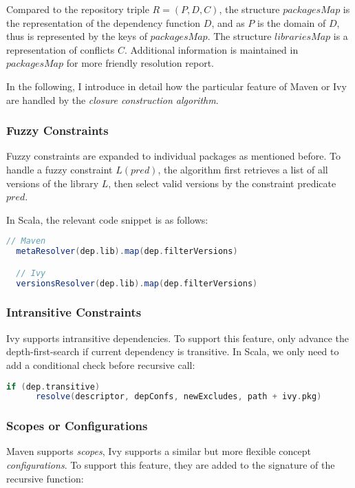 Compared to the repository triple $R = (P, D, C)$, the structure $packagesMap$ is the representation of the dependency function $D$, and as $P$ is the domain of $D$, thus is represented by the keys of $packagesMap$. The structure $librariesMap$ is a representation of conflicts $C$. Additional information is maintained in $packagesMap$ for more friendly resolution report.

In the following, I introduce in detail how the particular feature of Maven or Ivy are handled by the \emph{closure construction algorithm}.

\subsubsection{Fuzzy Constraints}

Fuzzy constraints are expanded to individual packages as mentioned before. To handle a fuzzy constraint $L(pred)$, the algorithm first retrieves a list of all versions of the library $L$, then select valid versions by the constraint predicate $pred$.

In Scala, the relevant code snippet is as follows:

\begin{lstlisting}[language=Scala]
  // Maven
  metaResolver(dep.lib).map(dep.filterVersions)

  // Ivy
  versionsResolver(dep.lib).map(dep.filterVersions)
\end{lstlisting}

\subsubsection{Intransitive Constraints}

Ivy supports intransitive dependencies. To support this feature, only advance the depth-first-search if current dependency is transitive. In Scala, we only need to add a conditional check before recursive call:

\begin{lstlisting}[language=Scala]
  if (dep.transitive)
      resolve(descriptor, depConfs, newExcludes, path + ivy.pkg)
\end{lstlisting}

\subsubsection{Scopes or Configurations}

Maven supports \emph{scopes}, Ivy supports a similar but more flexible concept \emph{configurations}. To support this feature, they are added to the signature of the recursive function:

